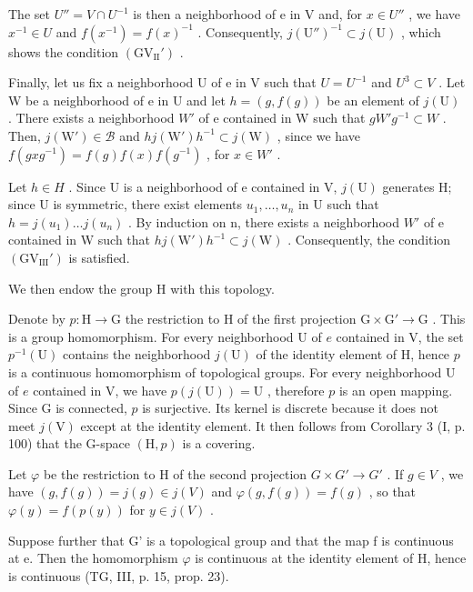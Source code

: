 The set \(U'' = V \cap U^{-1}\) is then a neighborhood of e in V and, for \(x \in U''\) , we have \(x^{-1} \in U\) and \(f(x^{-1}) = f(x)^{-1}\) . Consequently, \(j(\mathrm{U}'')^{-1} \subset j(\mathrm{U})\) , which shows the condition \((\mathrm{GV}_{\mathrm{II}}' )\) .

Finally, let us fix a neighborhood U of e in V such that \(U = U^{-1}\) and \(U^{3} \subset V\) . Let W be a neighborhood of e in U and let \(h = (g, f(g))\) be an element of \(j(\mathrm{U})\) . There exists a neighborhood \(W'\) of e contained in W such that \(gW'g^{-1} \subset W\) . Then, \(j(\mathrm{W}') \in \mathcal{B}\) and \(hj(\mathrm{W}')h^{-1} \subset j(\mathrm{W})\) , since we have \(f(gxg^{-1}) = f(g)f(x)f(g^{-1})\) , for \(x \in W'\) .

Let \(h \in H\) . Since U is a neighborhood of e contained in V, \(j(\mathrm{U})\) generates H; since U is symmetric, there exist elements \(u_{1}, \ldots, u_{n}\) in U such that \(h = j(u_{1}) \ldots j(u_{n})\) . By induction on n, there exists a neighborhood \(W'\) of e contained in W such that \(hj(\mathrm{W}')h^{-1} \subset j(\mathrm{W})\) . Consequently, the condition \((\mathrm{GV}_{\mathrm{III}}')\) is satisfied.

We then endow the group H with this topology.

Denote by \(p \colon \mathrm{H} \to \mathrm{G}\) the restriction to H of the first projection \(\mathrm{G} \times \mathrm{G}' \to \mathrm{G}\) . This is a group homomorphism. For every neighborhood U of \(e\) contained in V, the set \(p^{-1}(\mathrm{U})\) contains the neighborhood \(j(\mathrm{U})\) of the identity element of H, hence \(p\) is a continuous homomorphism of topological groups. For every neighborhood U of \(e\) contained in V, we have \(p(j(\mathrm{U})) = \mathrm{U}\) , therefore \(p\) is an open mapping. Since G is connected, \(p\) is surjective. Its kernel is discrete because it does not meet \(j(\mathrm{V})\) except at the identity element. It then follows from Corollary 3 (I, p. 100) that the G-space \((\mathrm{H}, p)\) is a covering.

Let \(\varphi\) be the restriction to H of the second projection \(G \times G' \to G'\) . If \(g \in V\) , we have \((g, f(g)) = j(g) \in j(V)\) and \(\varphi(g, f(g)) = f(g)\) , so that \(\varphi(y) = f(p(y))\) for \(y \in j(V)\) .

Suppose further that G' is a topological group and that the map f is continuous at e. Then the homomorphism \(\varphi\) is continuous at the identity element of H, hence is continuous (TG, III, p. 15, prop. 23).

